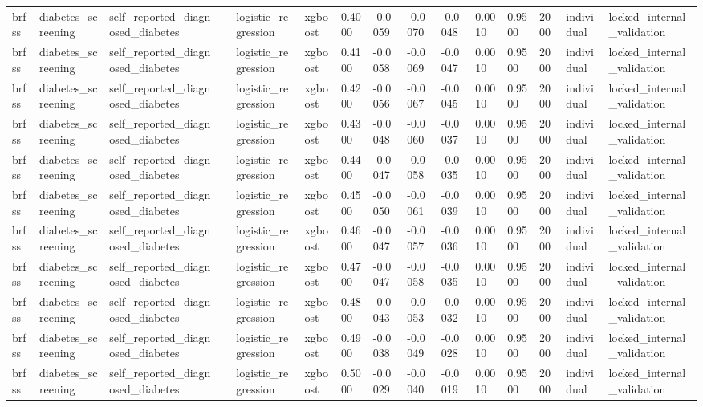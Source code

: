 \begin{tabular}{lllllllllllllll}
brfss & diabetes\_screening & self\_reported\_diagnosed\_diabetes &  & logistic\_regression & xgboost & 0.4000 & -0.0059 & -0.0070 & -0.0048 & 0.0010 & 0.9500 & 2000 & individual & locked\_internal\_validation \\
brfss & diabetes\_screening & self\_reported\_diagnosed\_diabetes &  & logistic\_regression & xgboost & 0.4100 & -0.0058 & -0.0069 & -0.0047 & 0.0010 & 0.9500 & 2000 & individual & locked\_internal\_validation \\
brfss & diabetes\_screening & self\_reported\_diagnosed\_diabetes &  & logistic\_regression & xgboost & 0.4200 & -0.0056 & -0.0067 & -0.0045 & 0.0010 & 0.9500 & 2000 & individual & locked\_internal\_validation \\
brfss & diabetes\_screening & self\_reported\_diagnosed\_diabetes &  & logistic\_regression & xgboost & 0.4300 & -0.0048 & -0.0060 & -0.0037 & 0.0010 & 0.9500 & 2000 & individual & locked\_internal\_validation \\
brfss & diabetes\_screening & self\_reported\_diagnosed\_diabetes &  & logistic\_regression & xgboost & 0.4400 & -0.0047 & -0.0058 & -0.0035 & 0.0010 & 0.9500 & 2000 & individual & locked\_internal\_validation \\
brfss & diabetes\_screening & self\_reported\_diagnosed\_diabetes &  & logistic\_regression & xgboost & 0.4500 & -0.0050 & -0.0061 & -0.0039 & 0.0010 & 0.9500 & 2000 & individual & locked\_internal\_validation \\
brfss & diabetes\_screening & self\_reported\_diagnosed\_diabetes &  & logistic\_regression & xgboost & 0.4600 & -0.0047 & -0.0057 & -0.0036 & 0.0010 & 0.9500 & 2000 & individual & locked\_internal\_validation \\
brfss & diabetes\_screening & self\_reported\_diagnosed\_diabetes &  & logistic\_regression & xgboost & 0.4700 & -0.0047 & -0.0058 & -0.0035 & 0.0010 & 0.9500 & 2000 & individual & locked\_internal\_validation \\
brfss & diabetes\_screening & self\_reported\_diagnosed\_diabetes &  & logistic\_regression & xgboost & 0.4800 & -0.0043 & -0.0053 & -0.0032 & 0.0010 & 0.9500 & 2000 & individual & locked\_internal\_validation \\
brfss & diabetes\_screening & self\_reported\_diagnosed\_diabetes &  & logistic\_regression & xgboost & 0.4900 & -0.0038 & -0.0049 & -0.0028 & 0.0010 & 0.9500 & 2000 & individual & locked\_internal\_validation \\
brfss & diabetes\_screening & self\_reported\_diagnosed\_diabetes &  & logistic\_regression & xgboost & 0.5000 & -0.0029 & -0.0040 & -0.0019 & 0.0010 & 0.9500 & 2000 & individual & locked\_internal\_validation \\

\end{tabular}
